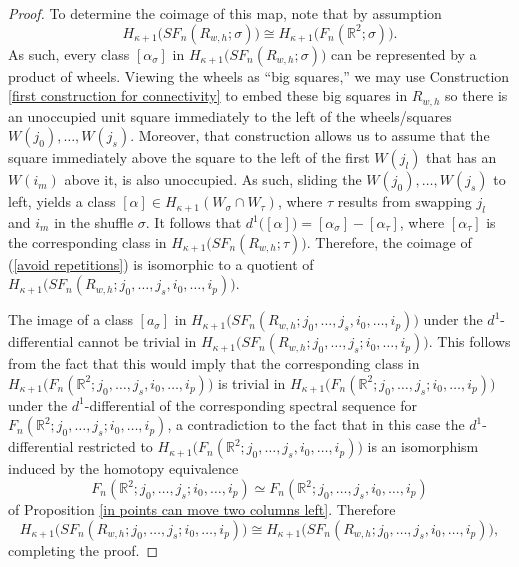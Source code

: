\documentclass[pagebackref,colorlinks,citecolor=blue,linkcolor=blue,urlcolor=blue,filecolor=blue]{article}
\theoremstyle{definition}\newtheorem{definition}[thm]{Definition}
\theoremstyle{definition}
\newcommand{\R}{\ensuremath{\mathbb{R}}}
\begin{document}
\begin{proof}
To determine the coimage of this map, note that by assumption
\[
H_{\kappa+1}\big(SF_{n}(R_{w, h}; \sigma)\big)\cong H_{\kappa+1}\big(F_{n}(\R^{2}; \sigma)\big).
\]
As such, every class $[\alpha_{\sigma}]$ in $H_{\kappa+1}\big(SF_{n}(R_{w, h}; \sigma)\big)$ can be represented by a product of wheels.
Viewing the wheels as ``big squares,'' we may use Construction \ref{first construction for connectivity} to embed these big squares in $R_{w, h}$ so there is an unoccupied unit square immediately to the left of the wheels/squares $W(j_{0}),\dots, W(j_{s})$.
Moreover, that construction allows us to assume that the square immediately above the square to the left of the first $W(j_{l})$ that has an $W(i_{m})$ above it, is also unoccupied.
As such, sliding the $W(j_{0}),\dots, W(j_{s})$ to left, yields a class $[\alpha]\in H_{\kappa+1}(W_{\sigma}\cap W_{\tau})$, where $\tau$ results from swapping $j_{l}$ and $i_{m}$ in the shuffle $\sigma$.
It follows that $d^{1}\big([\alpha]\big)=[\alpha_{\sigma}]-[\alpha_{\tau}]$, where $[\alpha_{\tau}]$ is the corresponding class in $H_{\kappa+1}\big(SF_{n}(R_{w, h}; \tau)\big)$.
Therefore, the coimage of (\ref{avoid repetitions})
is isomorphic to a quotient of $H_{\kappa+1}\big(SF_{n}(R_{w, h}; j_{0}, \dots, j_{s}, i_{0}, \dots, i_{p})\big)$.

The image of a class $[a_{\sigma}]$ in $H_{\kappa+1}\big(SF_{n}(R_{w, h}; j_{0}, \dots, j_{s}, i_{0}, \dots, i_{p})\big)$ under the $d^{1}$-differential cannot be trivial in $H_{\kappa+1}\big(SF_{n}(R_{w, h}; j_{0}, \dots, j_{s}; i_{0}, \dots, i_{p})\big)$.
This follows from the fact that this would imply that the corresponding class in $H_{\kappa+1}\big(F_{n}(\R^{2}; j_{0}, \dots, j_{s}, i_{0}, \dots, i_{p})\big)$ is trivial in $H_{\kappa+1}\big(F_{n}(\R^{2}; j_{0}, \dots, j_{s}; i_{0}, \dots, i_{p})\big)$ under the $d^{1}$-differential of the corresponding spectral sequence for $F_{n}(\R^{2}; j_{0}, \dots, j_{s}; i_{0}, \dots, i_{p})$, a contradiction to the fact that in this case the $d^{1}$-differential restricted to $H_{\kappa+1}\big(F_{n}(\R^{2}; j_{0}, \dots, j_{s}, i_{0}, \dots, i_{p})\big)$ is an isomorphism induced by the homotopy equivalence 
\[
F_{n}(\R^{2}; j_{0}, \dots, j_{s}; i_{0}, \dots, i_{p})\simeq F_{n}(\R^{2}; j_{0}, \dots, j_{s}, i_{0}, \dots, i_{p})
\]
of Proposition \ref{in points can move two columns left}.
Therefore
\[
H_{\kappa+1}\big(SF_{n}(R_{w, h}; j_{0}, \dots, j_{s}; i_{0}, \dots, i_{p})\big)\cong H_{\kappa+1}\big(SF_{n}(R_{w, h}; j_{0}, \dots, j_{s}, i_{0}, \dots, i_{p})\big),
\]
completing the proof.
\end{proof}
\end{document}
